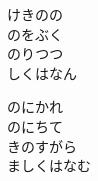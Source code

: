 \documentclass[10pt,b5j]{tarticle} %
\begin{document}
\begin{enumerate}
\begin{minipage}[c]{\blocksize}
        \vspace{\linespace}
        \item
        けきのの\\
        のをぶく\\
        のりつつ\\
        しくはなん
        
        \vspace{\linespace}
        \item
        のにかれ\\
        のにちて\\
        きのすがら\\
        ましくはなむ
    
    \end{minipage}
\end{enumerate} %
\end{document}
